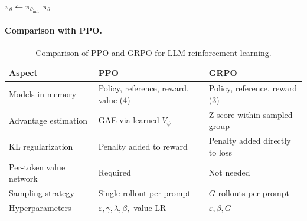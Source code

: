 \documentclass[12pt,a4paper]{report}
\theoremstyle{definition}
\begin{document}
\begin{algorithm2e}[t]
\DontPrintSemicolon
\SetAlgoLined
{}
\BlankLine
$\pi_\theta \leftarrow \pi_{\theta_{\text{init}}}$ \;
\Return $\pi_\theta$ \;
\caption{Group Relative Policy Optimization (GRPO)}
\label{alg:grpo}
\end{algorithm2e}

\paragraph{Comparison with PPO.}

\begin{table}[t]
\centering
\caption{Comparison of PPO and GRPO for LLM reinforcement learning.}
\label{tab:ppo-vs-grpo}
\small
\begin{tabular}{@{}lll@{}}
\toprule
\textbf{Aspect} & \textbf{PPO} & \textbf{GRPO} \\
\midrule
Models in memory &
  Policy, reference, reward, value (4) &
  Policy, reference, reward (3) \\
Advantage estimation &
  GAE via learned $V_\psi$ &
  Z-score within sampled group \\
KL regularization &
  Penalty added to reward &
  Penalty added directly to loss \\
Per-token value network &
  Required &
  Not needed \\
Sampling strategy &
  Single rollout per prompt &
  $G$ rollouts per prompt \\
Hyperparameters &
  $\varepsilon, \gamma, \lambda, \beta,$ value LR &
  $\varepsilon, \beta, G$ \\
\bottomrule
\end{tabular}
\end{table}
\end{document}
